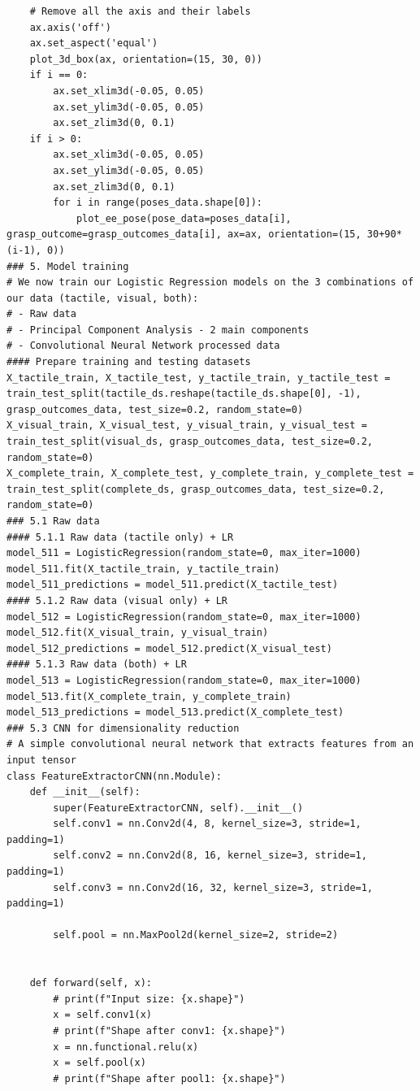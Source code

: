 \documentclass[11pt, a4paper]{report}
\begin{document}
\begin{lstlisting}
    # Remove all the axis and their labels
    ax.axis('off')
    ax.set_aspect('equal')
    plot_3d_box(ax, orientation=(15, 30, 0))
    if i == 0:
        ax.set_xlim3d(-0.05, 0.05)
        ax.set_ylim3d(-0.05, 0.05)
        ax.set_zlim3d(0, 0.1)
    if i > 0:
        ax.set_xlim3d(-0.05, 0.05)
        ax.set_ylim3d(-0.05, 0.05)
        ax.set_zlim3d(0, 0.1)
        for i in range(poses_data.shape[0]):
            plot_ee_pose(pose_data=poses_data[i], grasp_outcome=grasp_outcomes_data[i], ax=ax, orientation=(15, 30+90*(i-1), 0))
### 5. Model training
# We now train our Logistic Regression models on the 3 combinations of our data (tactile, visual, both):
# - Raw data
# - Principal Component Analysis - 2 main components
# - Convolutional Neural Network processed data
#### Prepare training and testing datasets
X_tactile_train, X_tactile_test, y_tactile_train, y_tactile_test = train_test_split(tactile_ds.reshape(tactile_ds.shape[0], -1), grasp_outcomes_data, test_size=0.2, random_state=0)
X_visual_train, X_visual_test, y_visual_train, y_visual_test = train_test_split(visual_ds, grasp_outcomes_data, test_size=0.2, random_state=0)
X_complete_train, X_complete_test, y_complete_train, y_complete_test = train_test_split(complete_ds, grasp_outcomes_data, test_size=0.2, random_state=0)
### 5.1 Raw data
#### 5.1.1 Raw data (tactile only) + LR
model_511 = LogisticRegression(random_state=0, max_iter=1000)
model_511.fit(X_tactile_train, y_tactile_train)
model_511_predictions = model_511.predict(X_tactile_test)
#### 5.1.2 Raw data (visual only) + LR
model_512 = LogisticRegression(random_state=0, max_iter=1000)
model_512.fit(X_visual_train, y_visual_train)
model_512_predictions = model_512.predict(X_visual_test)
#### 5.1.3 Raw data (both) + LR
model_513 = LogisticRegression(random_state=0, max_iter=1000)
model_513.fit(X_complete_train, y_complete_train)
model_513_predictions = model_513.predict(X_complete_test)
### 5.3 CNN for dimensionality reduction
# A simple convolutional neural network that extracts features from an input tensor
class FeatureExtractorCNN(nn.Module):
    def __init__(self):
        super(FeatureExtractorCNN, self).__init__()
        self.conv1 = nn.Conv2d(4, 8, kernel_size=3, stride=1, padding=1)
        self.conv2 = nn.Conv2d(8, 16, kernel_size=3, stride=1, padding=1)
        self.conv3 = nn.Conv2d(16, 32, kernel_size=3, stride=1, padding=1)

        self.pool = nn.MaxPool2d(kernel_size=2, stride=2)


    def forward(self, x):
        # print(f"Input size: {x.shape}")
        x = self.conv1(x)
        # print(f"Shape after conv1: {x.shape}")
        x = nn.functional.relu(x)
        x = self.pool(x)
        # print(f"Shape after pool1: {x.shape}")


\end{lstlisting}
\end{document}
